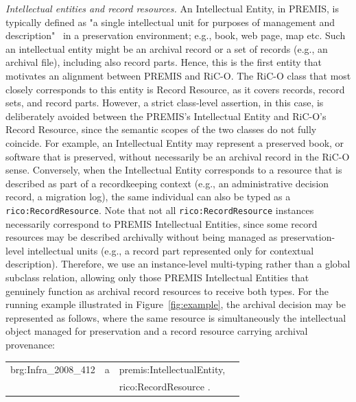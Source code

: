 \documentclass[runningheads]{llncs}
\makeatletter
\newenvironment{rdfexpressions}
{%
	\par
	\begingroup
	\centering
	\ttfamily
	\begin{tabular}{@{}r@{\ }l@{\ }l@{}l@{}}
	}
	{%
	\end{tabular}
	\par
	\endgroup
}
\makeatother
\begin{document}
	
	\emph{Intellectual entities and record resources.} An Intellectual Entity, in PREMIS, is typically defined as "a single intellectual unit for purposes of management and description"~\cite{premis_data_dictionary_2015} in a preservation environment; e.g., book, web page, map etc. Such an intellectual entity might be an archival record or a set of records (e.g., an archival file), including also record parts. Hence, this is the  first entity that motivates an alignment between PREMIS and RiC-O. The RiC-O class that most closely corresponds to this entity is Record Resource, as it covers records, record sets, and record parts. However, a strict class-level assertion, in this case, is deliberately avoided between the PREMIS's Intellectual Entity and RiC-O's  Record Resource, since the semantic scopes of the two classes do not fully coincide. For example, an Intellectual Entity may represent a preserved book, or software that is preserved, without necessarily be an archival record in the RiC-O sense. Conversely, when the Intellectual Entity corresponds to a resource that is described as part of a recordkeeping context (e.g., an administrative decision record, a migration log), the same individual can also be typed as a \texttt{rico:RecordResource}. Note that not all \texttt{rico:RecordResource} instances necessarily correspond to PREMIS Intellectual Entities, since some record resources may be described archivally without being managed as preservation-level intellectual units (e.g., a record part represented only for contextual description). Therefore, we use an instance-level multi-typing rather than a global subclass relation, allowing only those PREMIS Intellectual Entities that genuinely function as archival record resources to receive both types. For the running example illustrated in Figure~\ref{fig:example}, the archival decision may be represented as follows, where the same resource is simultaneously the intellectual object managed for preservation and a record resource carrying archival provenance:
	\begin{rdfexpressions}
		brg:Infra\_2008\_412 & a & premis:IntellectualEntity, & \\
		& & rico:RecordResource .
	\end{rdfexpressions}
	
\end{document}

